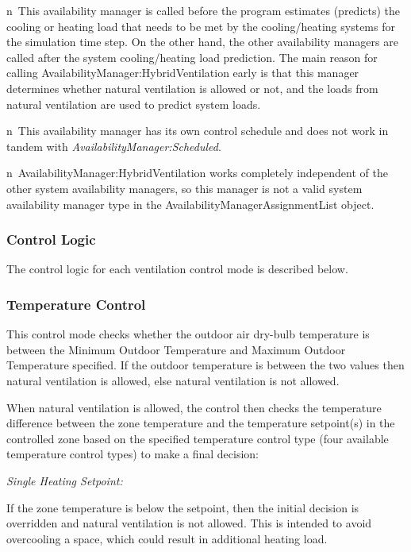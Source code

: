 n~This availability manager is called before the program estimates (predicts) the cooling or heating load that needs to be met by the cooling/heating systems for the simulation time step. On the other hand, the other availability managers are called after the system cooling/heating load prediction. The main reason for calling AvailabilityManager:HybridVentilation early is that this manager determines whether natural ventilation is allowed or not, and the loads from natural ventilation are used to predict system loads.

n~This availability manager has its own control schedule and does not work in tandem with \emph{AvailabilityManager:Scheduled}.

n~AvailabilityManager:HybridVentilation works completely independent of the other system availability managers, so this manager is not a valid system availability manager type in the AvailabilityManagerAssignmentList object.

\subsubsection{Control Logic}\label{control-logic-000}

The control logic for each ventilation control mode is described below.

\subsubsection{Temperature Control}\label{temperature-control}

This control mode checks whether the outdoor air dry-bulb temperature is between the Minimum Outdoor Temperature and Maximum Outdoor Temperature specified. If the outdoor temperature is between the two values then natural ventilation is allowed, else natural ventilation is not allowed.

When natural ventilation is allowed, the control then checks the temperature difference between the zone temperature and the temperature setpoint(s) in the controlled zone based on the specified temperature control type (four available temperature control types) to make a final decision:

\emph{Single Heating Setpoint:}

If the zone temperature is below the setpoint, then the initial decision is overridden and natural ventilation is not allowed. This is intended to avoid overcooling a space, which could result in additional heating load.

